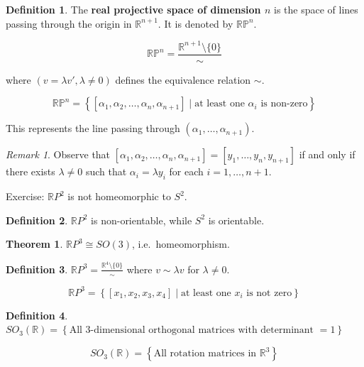 \documentclass[11pt]{article}
\theoremstyle{definition}
\newtheorem{definition}{Definition}[section]
\newtheorem{theorem}{Theorem}[section]
\theoremstyle{remark}
\newtheorem{remark}{Remark}[section]
\begin{document}
\begin{definition}\label{def:real_projective_space_n}
The \textbf{real projective space of dimension \(n\)} is the space of lines passing through the origin in \(\mathbb{R}^{n+1}\). It is denoted by \(\mathbb{RP}^n\).
\end{definition}

\[
\mathbb{RP}^n = \frac{\mathbb{R}^{n+1} \setminus \{0\}}{\sim}
\]

where \((v = \lambda v', \lambda \neq 0)\) defines the equivalence relation \(\sim\).

\[
\mathbb{RP}^n = \left\{ [\alpha_1, \alpha_2, \ldots, \alpha_n, \alpha_{n+1}] \mid \text{at least one } \alpha_i \text{ is non-zero} \right\}
\]

This represents the line passing through \((\alpha_1, \ldots, \alpha_{n+1})\).

\begin{remark}\label{rem:equivalence_class}
Observe that \([\alpha_1, \alpha_2, \ldots, \alpha_n, \alpha_{n+1}] = [y_1, \ldots, y_n, y_{n+1}]\) if and only if there exists \(\lambda \neq 0\) such that \(\alpha_i = \lambda y_i\) for each \(i = 1, \ldots, n+1\).
\end{remark}

Exercise: $\mathbb{R}P^2$ is not homeomorphic to $S^2$.

\begin{definition}
$\mathbb{R}P^2$ is non-orientable, while $S^2$ is orientable.
\end{definition}

\begin{theorem}\label{thm:homeomorphism_RP3_SO3}
$\mathbb{R}P^3 \cong SO(3)$, i.e.\ homeomorphism.
\end{theorem}

\begin{definition}\label{def:RP3}
$\mathbb{R}P^3 = \frac{\mathbb{R}^4 \setminus \{0\}}{\sim}$ where $v \sim \lambda v$ for $\lambda \neq 0$.
\end{definition}

\[
\mathbb{R}P^3 = \left\{ [x_1, x_2, x_3, x_4] \mid \text{at least one } x_i \text{ is not zero} \right\}
\]

\begin{definition}\label{def:SO3}
$SO_3(\mathbb{R}) = \left\{ \text{All 3-dimensional orthogonal matrices with determinant } = 1 \right\}$
\end{definition}

\[
SO_3(\mathbb{R}) = \left\{ \text{All rotation matrices in } \mathbb{R}^3 \right\}
\]
\end{document}

